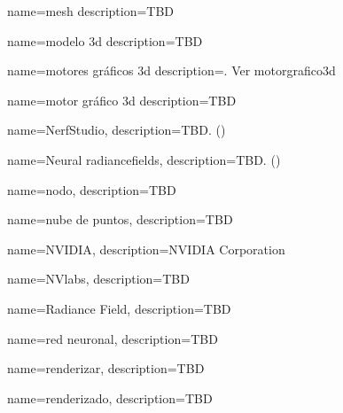 



{
    name={mesh}
    description={TBD}
}

{
    name={modelo \acrshort{3d}}
    description={TBD}
}

{
    name={motores gráficos \acrshort{3d}}
    description={. Ver \gls{motorgrafico3d}}
}

{
    name={motor gráfico \acrshort{3d}}
    description={TBD}
}


{
    name={NerfStudio},
    description={TBD. (\cite{nerfstudio})}
}

{
    name={Neural \glspl{radiancefield}},
    description={TBD. (\cite{mildenhall2020nerf})}
}

{
    name={nodo},
    description={TBD}
}

{
    name={nube de puntos},
    description={TBD}
}

{
    name={NVIDIA},
    description={NVIDIA Corporation}
}

{
    name={NVlabs},
    description={TBD}
}





{
    name={Radiance Field},
    description={TBD}
}

{
    name={red neuronal},
    description={TBD}
}

{
    name={renderizar},
    description={TBD}
}

{
    name={renderizado},
    description={TBD}
}

